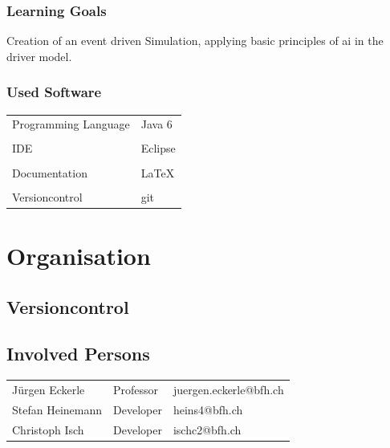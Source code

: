 \documentclass[a4paper,10pt,titlepage]{article}
\begin{document}
\subsubsection{Learning Goals}
Creation of an event driven Simulation, applying basic principles of ai in the driver model.

\subsubsection{Used Software}
\begin{tabular}{ll}
Programming Language & Java 6 \\
& \\
IDE & Eclipse \\
& \\
Documentation & \LaTeX \\
& \\
Versioncontrol & git \\
\end{tabular}

\section{Organisation}
\subsection{Versioncontrol}

\subsection{Involved Persons}

\begin{tabularx}{\textwidth}{XXX}
 Jürgen Eckerle & Professor & juergen.eckerle@bfh.ch \\
 Stefan Heinemann & Developer & heins4@bfh.ch \\
 Christoph Isch & Developer & ischc2@bfh.ch \\
\end{tabularx}
\end{document}
